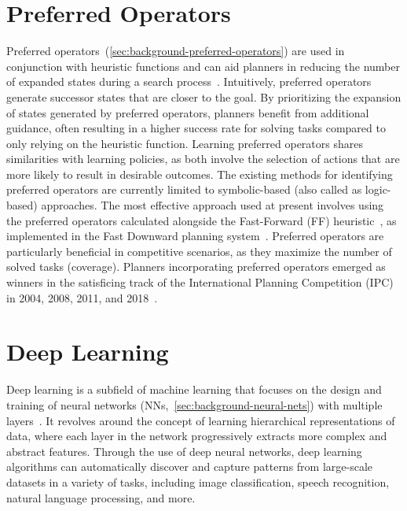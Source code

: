 \documentclass[ppgc,diss,english]{iiufrgs}
\begin{document}
\section{Preferred Operators}
\label{sec:intro-preferred-ops}
Preferred operators~(\cref{sec:background-preferred-operators}) are used in conjunction with heuristic functions and can aid planners in reducing the number of expanded states during a search process~\cite{Helmert/2006,Richter.Helmert/2009}. Intuitively, preferred operators generate successor states that are closer to the goal. By prioritizing the expansion of states generated by preferred operators, planners benefit from additional guidance, often resulting in a higher success rate for solving tasks compared to only relying on the heuristic function. Learning preferred operators shares similarities with learning policies, as both involve the selection of actions that are more likely to result in desirable outcomes. The existing methods for identifying preferred operators are currently limited to symbolic-based (also called as logic-based) approaches. The most effective approach used at present involves using the preferred operators calculated alongside the Fast-Forward (FF) heuristic~\cite{Hoffmann.Nebel/2001}, as implemented in the Fast Downward planning system~\cite{Helmert/2006}. Preferred operators are particularly beneficial in competitive scenarios, as they maximize the number of solved tasks (coverage). Planners incorporating preferred operators emerged as winners in the satisficing track of the International Planning Competition (IPC) in 2004, 2008, 2011, and 2018~\cite{Helmert/2006,Richter.lama.etal/2011,Richter.lama.etal/2011,Seipp-fast.etal/2018}.

\section{Deep Learning}
\label{sec:intro-deep-learning}
Deep learning is a subfield of machine learning that focuses on the design and training of neural networks (NNs,~\cref{sec:background-neural-nets}) with multiple layers~\cite{Goodfellow.etal/2016}. It revolves around the concept of learning hierarchical representations of data, where each layer in the network progressively extracts more complex and abstract features. Through the use of deep neural networks, deep learning algorithms can automatically discover and capture patterns from large-scale datasets in a variety of tasks, including image classification, speech recognition, natural language processing, and more.
\end{document}
